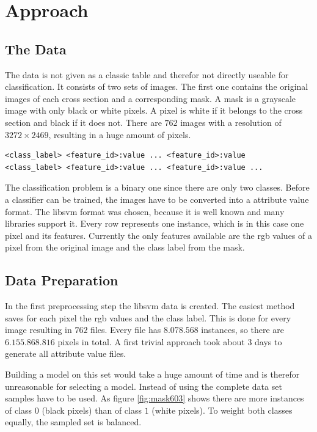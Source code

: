 
\section{Approach}


\subsection{The Data}

The data is not given as a classic table and therefor not directly
useable for classification. It consists of two sets of images. The
first one contains the original images of each cross section and a
corresponding mask. A mask is a grayscale image with only black or
white pixels. A pixel is white if it belongs to the cross section
and black if it does not. There are $762$ images with a resolution
of $3272\times2469$, resulting in a huge amount of pixels.

\begin{lstlisting}[caption=libsvm format,label=lisbsvm] 
<class_label> <feature_id>:value ... <feature_id>:value
<class_label> <feature_id>:value ... <feature_id>:value ... 
\end{lstlisting} 

The classification problem is a binary one since there are only two
classes. Before a classifier can be trained, the images have to be
converted into a attribute value format. The libsvm format was chosen,
because it is well known and many libraries support it. Every row
represents one instance, which is in this case one pixel and its features.
Currently the only features available are the rgb values of a pixel
from the original image and the class label from the mask. 


\subsection{Data Preparation}

In the first preprocessing step the libsvm data is created. The easiest
method saves for each pixel the rgb values and the class label. This
is done for every image resulting in $762$ files. Every file has
$8.078.568$ instances, so there are $6.155.868.816$ pixels in total.
A first trivial approach took about 3 days to generate all attribute
value files.

Building a model on this set would take a huge amount of time and
is therefor unreasonable for selecting a model. Instead of using the
complete data set samples have to be used. As figure \ref{fig:mask603}
shows there are more instances of class $0$ (black pixels) than of
class $1$ (white pixels). To weight both classes equally, the sampled
set is balanced. 


